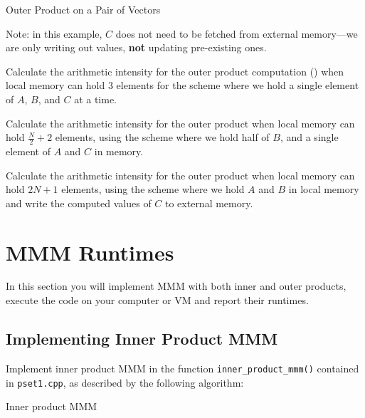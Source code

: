 \documentclass[a4 paper]{article}
\begin{document}
\begin{algorithm}
\SetAlgoLined
\SetInd{0.25em}{0.5em}
\caption{Outer Product on a Pair of Vectors}
\label{algo:outer-product}
\end{algorithm}
\noindent
Note: in this example, $C$ does not need to be fetched from external memory---we are only writing out values, \textbf{not} updating pre-existing ones.

Calculate the arithmetic intensity for the outer product computation () when local memory can hold 3 elements for the scheme where we hold a single element of $A$, $B$, and $C$ at a time.

\solution{}

Calculate the arithmetic intensity for the outer product when local memory can hold $\frac{N}{2} + 2$ elements, using the scheme where we hold half of $B$, and a single element of $A$ and $C$ in memory.

\solution{}

Calculate the arithmetic intensity for the outer product when local memory can hold $2N + 1$ elements, using the scheme where we hold $A$ and $B$ in local memory and write the computed values of $C$ to external memory.

\solution{}


\newpage
\section{MMM Runtimes}
\label{sec:eval}
In this section you will implement MMM with both inner and outer products, execute the code on your computer or VM and report their runtimes.

\subsection*{Implementing Inner Product MMM}
Implement inner product MMM in the function \texttt{inner\_product\_mmm()} contained in \texttt{pset1.cpp}, as described by the following algorithm:
\begin{algorithm}
\SetAlgoLined
\SetInd{0.25em}{0.5em}
\caption{Inner product MMM}
\label{algo:naivemm-mnk}
\end{algorithm}
\end{document}

